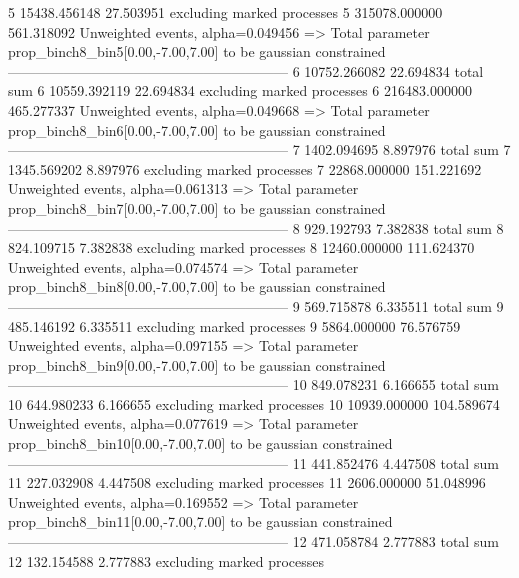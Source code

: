 5          15438.456148    27.503951       excluding marked processes    
5          315078.000000   561.318092      Unweighted events, alpha=0.049456
  => Total parameter prop_binch8_bin5[0.00,-7.00,7.00] to be gaussian constrained
------------------------------------------------------------
6          10752.266082    22.694834       total sum                     
6          10559.392119    22.694834       excluding marked processes    
6          216483.000000   465.277337      Unweighted events, alpha=0.049668
  => Total parameter prop_binch8_bin6[0.00,-7.00,7.00] to be gaussian constrained
------------------------------------------------------------
7          1402.094695     8.897976        total sum                     
7          1345.569202     8.897976        excluding marked processes    
7          22868.000000    151.221692      Unweighted events, alpha=0.061313
  => Total parameter prop_binch8_bin7[0.00,-7.00,7.00] to be gaussian constrained
------------------------------------------------------------
8          929.192793      7.382838        total sum                     
8          824.109715      7.382838        excluding marked processes    
8          12460.000000    111.624370      Unweighted events, alpha=0.074574
  => Total parameter prop_binch8_bin8[0.00,-7.00,7.00] to be gaussian constrained
------------------------------------------------------------
9          569.715878      6.335511        total sum                     
9          485.146192      6.335511        excluding marked processes    
9          5864.000000     76.576759       Unweighted events, alpha=0.097155
  => Total parameter prop_binch8_bin9[0.00,-7.00,7.00] to be gaussian constrained
------------------------------------------------------------
10         849.078231      6.166655        total sum                     
10         644.980233      6.166655        excluding marked processes    
10         10939.000000    104.589674      Unweighted events, alpha=0.077619
  => Total parameter prop_binch8_bin10[0.00,-7.00,7.00] to be gaussian constrained
------------------------------------------------------------
11         441.852476      4.447508        total sum                     
11         227.032908      4.447508        excluding marked processes    
11         2606.000000     51.048996       Unweighted events, alpha=0.169552
  => Total parameter prop_binch8_bin11[0.00,-7.00,7.00] to be gaussian constrained
------------------------------------------------------------
12         471.058784      2.777883        total sum                     
12         132.154588      2.777883        excluding marked processes    
